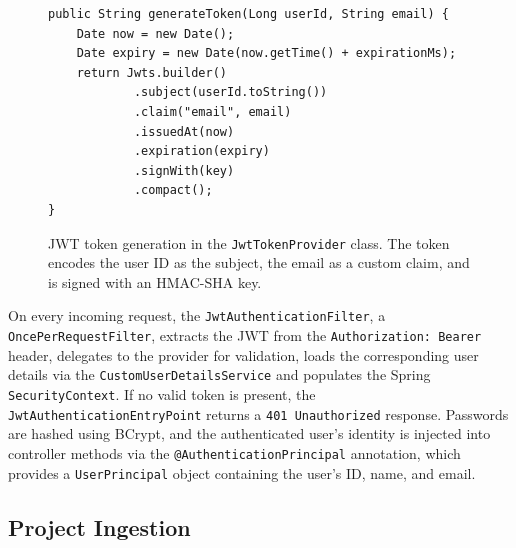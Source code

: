 
\begin{figure}[htbp]
    \begin{verbatim}
public String generateToken(Long userId, String email) {
    Date now = new Date();
    Date expiry = new Date(now.getTime() + expirationMs);
    return Jwts.builder()
            .subject(userId.toString())
            .claim("email", email)
            .issuedAt(now)
            .expiration(expiry)
            .signWith(key)
            .compact();
}
    \end{verbatim}
    \caption{JWT token generation in the \texttt{JwtTokenProvider} class. The token encodes the user ID as the subject, the email as a custom claim, and is signed with an HMAC-SHA key.}
    \label{lst:jwt-generate}
\end{figure}

On every incoming request, the \texttt{JwtAuthenticationFilter}, a \texttt{Once\-Per\-Re\-questFil\-ter}, extracts the JWT from the \texttt{Authorization: Bearer} header, delegates to the provider for validation, loads the corresponding user details via the \texttt{Cus\-tomU\-serDe\-tailsSer\-vice} and populates the Spring \texttt{ SecurityContext}. If no valid token is present, the \texttt{JwtAuthenticationEntryPoint} returns a \texttt{401 Un\-au\-thor\-ized} response. Passwords are hashed using BCrypt, and the authenticated user's identity is injected into controller methods via the \texttt{@Au\-then\-ti\-ca\-tionPrin\-ci\-pal} annotation, which provides a \texttt{UserPrincipal} object containing the user's ID, name, and email.

\subsection{Project Ingestion}
\label{subsec:project-ingestion}

